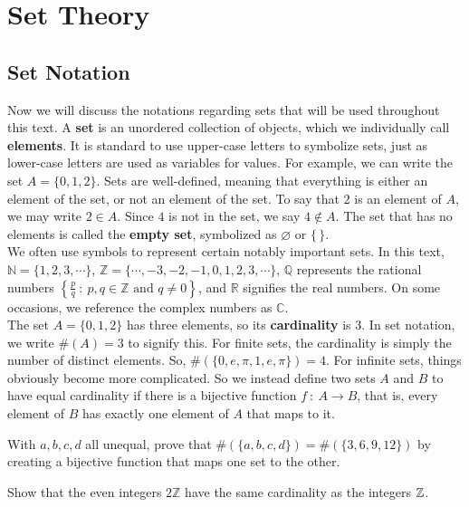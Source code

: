 \clearpage

\section{Set Theory}

\subsection{Set Notation}


Now we will discuss the notations regarding sets that will be used throughout this text. A \textbf{set} is an unordered collection of objects, which we individually call \textbf{elements}.  It is standard to use upper-case letters to symbolize sets, just as lower-case letters are used as variables for values. For example, we can write the set $A=\{0, 1, 2\}$. Sets are well-defined, meaning that everything is either an element of the set, or not an element of the set. To say that $2$ is an element of $A$, we may write $2\in A$. Since $4$ is not in the set, we say $4\notin A$. The set that has no elements is called the \textbf{empty set}, symbolized as $\varnothing$ or $\{\, \}$.\\

We often use symbols to represent certain notably important sets. In this text, $\mathbb{N}=\{1,2,3,\cdots\}$, $\mathbb{Z}=\{\cdots, -3, -2, -1, 0, 1,2,3,\cdots\}$, $\mathbb{Q}$ represents the rational numbers $\left\{\frac{p}{q}\ :\ p,q\in\mathbb{Z}\text{ and } q\neq 0\right\}$, and $\mathbb{R}$ signifies the real numbers. On some occasions, we reference the complex numbers as $\mathbb{C}$. \\

The set $A=\{0,1,2\}$ has three elements, so its \textbf{cardinality} is 3. In set notation, we write $\#(A)=3$ to signify this. For finite sets, the cardinality is simply the number of distinct elements. So, $\#(\{0,e,\pi,1,e,\pi\})=4$. For infinite sets, things obviously become more complicated. So we instead define two sets $A$ and $B$ to have equal cardinality if there is a bijective function $f\ :\ A\to B$, that is, every element of $B$ has exactly one element of $A$ that maps to it. \\

\begin{exercise}
    With $a,b,c,d$ all unequal, prove that $\#(\{a,b,c,d\})  = \#(\{3,6,9,12\})$ by creating a bijective function that maps one set to the other. 
\end{exercise}
\vspace{-5mm}
\begin{exercise}
    Show that the even integers $2\mathbb{Z}$ have the same cardinality as the integers $\mathbb{Z}$. 
\end{exercise}

